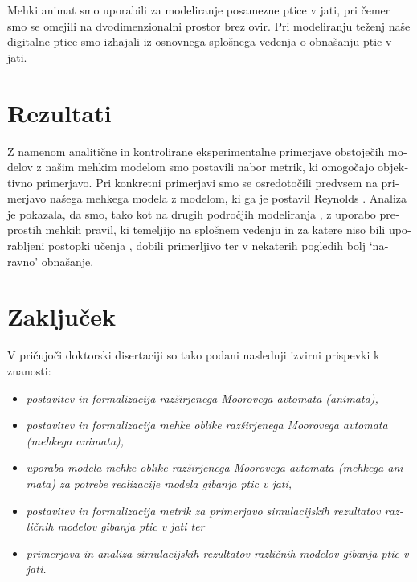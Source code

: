 \begin{slovenian}
Mehki animat smo uporabili za modeliranje posamezne ptice v jati, pri čemer smo se omejili na dvodimenzionalni prostor brez ovir. Pri modeliranju teženj naše digitalne ptice smo izhajali iz osnovnega splošnega vedenja o obnašanju ptic v jati.

\section{Rezultati}
Z namenom analitične in kontrolirane eksperimentalne primerjave obstoječih modelov z našim mehkim modelom smo postavili nabor metrik, ki omogočajo objektivno primerjavo. Pri konkretni primerjavi smo se osredotočili predvsem na primerjavo našega mehkega modela z modelom, ki ga je postavil Reynolds \cite{reynolds:1987,reynolds:1999}. Analiza je pokazala, da smo, tako kot na drugih področjih modeliranja \cite{mraz:1999,mraz:2001}, z uporabo preprostih mehkih pravil, ki temeljijo na splošnem vedenju in za katere niso bili uporabljeni postopki učenja \cite{bonarini:1996}, dobili primerljivo ter v nekaterih pogledih bolj `naravno' obnašanje.

\section{Zaključek}
V pričujoči doktorski disertaciji so tako podani naslednji izvirni prispevki k znanosti:
\begin{itemize}
\item \emph{postavitev in formalizacija razširjenega Moorovega avtomata (animata),}
\item \emph{postavitev in formalizacija mehke oblike razširjenega Moorovega avtomata (mehkega animata),}
\item \emph{uporaba modela mehke oblike razširjenega Moorovega avtomata (mehkega animata) za potrebe realizacije modela gibanja ptic v jati,}
\item \emph{postavitev in formalizacija metrik za primerjavo simulacijskih rezultatov različnih modelov gibanja ptic v jati ter} 
\item \emph{primerjava in analiza simulacijskih rezultatov različnih modelov gibanja ptic v jati.}
\end{itemize}

\end{slovenian}